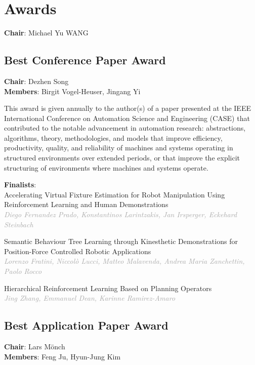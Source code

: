 \documentclass[
	openany, %
	parskip=full, %
	12pt, %
	a4paper, %
]{conferencebooklet} %
\begin{document}
\chapter{Awards}

\begin{multicols*}{2}

\textbf{Chair}: Michael Yu WANG

\section{Best Conference Paper Award}
\textbf{Chair}: Dezhen Song \\
\textbf{Members}: Birgit Vogel-Heuser, Jingang Yi

This award is given annually to the author(s) of a paper presented at the IEEE International Conference on Automation Science and Engineering (CASE) that contributed to the notable advancement in automation research: abstractions, algorithms, theory, methodologies, and models that improve efficiency, productivity, quality, and reliability of machines and systems operating in structured environments over extended periods, or that improve the explicit structuring of environments where machines and systems operate.

\textbf{Finalists}: \\
\small Accelerating Virtual Fixture Estimation for Robot Manipulation Using Reinforcement Learning and Human Demonstrations \\
\footnotesize \textit{\textcolor{darkgray}{Diego Fernandez Prado, Konstantinos Larintzakis, Jan Irsperger, Eckehard Steinbach}}

\small Semantic Behaviour Tree Learning through Kinesthetic Demonstrations for Position-Force Controlled Robotic Applications \\
\footnotesize \textit{\textcolor{darkgray}{Lorenzo Fratini, Niccolò Lucci, Matteo Malavenda, Andrea Maria Zanchettin, Paolo Rocco}}

\small Hierarchical Reinforcement Learning Based on Planning Operators \\
\footnotesize \textit{\textcolor{darkgray}{Jing Zhang, Emmanuel Dean, Karinne Ramirez-Amaro}} 

\normalsize

\section{Best Application Paper Award}
\textbf{Chair}: Lars Mönch \\
\textbf{Members}: Feng Ju, Hyun-Jung Kim 


\end{multicols*}
\end{document}
